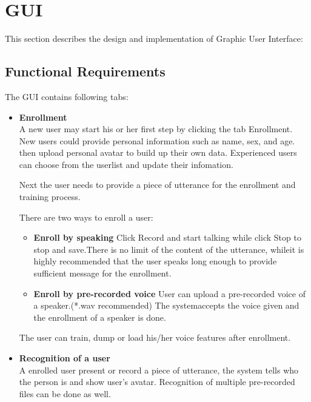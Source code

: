 \section{GUI}
	This section describes the design and implementation of Graphic User Interface:
\subsection{Functional Requirements}
	The GUI contains following tabs:
	\begin{itemize}
		\item \textbf{Enrollment} \\
			A new user may start his or her first step by clicking the 
			tab Enrollment. New users could provide personal information 
			such as name, sex, and age. then upload personal avatar to 
			build up their own data. Experienced users can choose from 
			the userlist and update their infomation.

			Next the user needs to provide a piece of utterance for
			the enrollment and training process.

			There are two ways to enroll a user:
			\begin{itemize}
				\item \textbf{Enroll by speaking}
					Click Record and start talking while click Stop to stop 
					and save.There is no limit of the content of the utterance,
					whileit is highly recommended that the user speaks long enough
					to provide sufficient message for the enrollment.

				\item \textbf{Enroll by pre-recorded voice}
					User can upload a pre-recorded voice of a speaker.(*.wav recommended)
					The systemaccepts the voice given and the enrollment of a speaker is done.
			\end{itemize}

			The user can train, dump or load his/her voice features after enrollment.

		\item \textbf{Recognition of a user} \\
			A enrolled user present or record a piece of utterance,
			the system tells who the person is and show user's avatar.
			Recognition of multiple pre-recorded files can be done as well.


\end{itemize}
